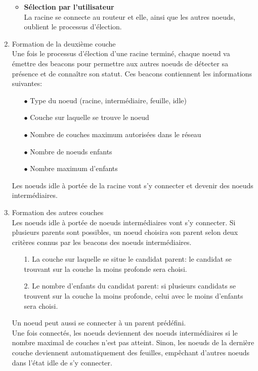 \begin{enumerate}
\begin{itemize}
                    \item \textbf{Sélection par l'utilisateur}\\
                        La racine se connecte au routeur et elle, ainsi que les autres noeuds, oublient le processus
                        d'élection.
                \end{itemize}
            \item Formation de la deuxième couche\\
                Une fois le processus d'élection d'une racine terminé, chaque noeud va émettre des beacons
                pour permettre aux autres noeuds de détecter sa présence et de connaître son statut.
                Ces beacons contiennent les informations suivantes:
                \begin{itemize}
                    \item[$\bullet$] Type du noeud (racine, intermédiaire, feuille, idle)
                    \item[$\bullet$] Couche sur laquelle se trouve le noeud
                    \item[$\bullet$] Nombre de couches maximum autorisées dans le réseau
                    \item[$\bullet$] Nombre de noeuds enfants
                    \item[$\bullet$] Nombre maximum d'enfants   
                \end{itemize}
                Les noeuds idle à portée de la racine vont s'y connecter et devenir des noeuds intermédiaires.
            
            \item Formation des autres couches\\
                Les noeuds idle à portée de noeuds intermédiaires vont s'y connecter. Si plusieurs parents
                sont possibles, un noeud choisira son parent selon deux critères connus par les beacons des noeuds intermédiaires.
                \begin{enumerate}
                    \addtolength{\itemindent}{1cm}
                    \item[1.] La couche sur laquelle se situe le candidat parent:
                        le candidat se trouvant sur la couche la moins profonde sera choisi. 
                    \item[2.] Le nombre d'enfants du candidat parent: si plusieurs candidats se trouvent
                        sur la couche la moins profonde, celui avec le moins d'enfants sera choisi. 
                \end{enumerate}
                
                Un noeud peut aussi se connecter à un parent prédéfini.\\

                Une fois connectés, les noeuds deviennent des noeuds intermédiaires si le nombre maximal de couches n'est pas atteint.
                Sinon, les noeuds de la dernière couche deviennent automatiquement
                des feuilles, empêchant d'autres noeuds dans l'état idle de s'y connecter.

        \end{enumerate}

